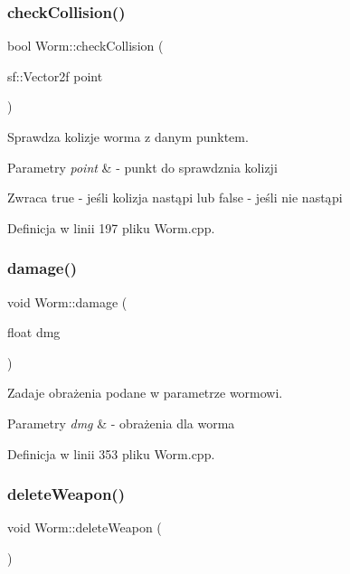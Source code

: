 \subsubsection{\texorpdfstring{check\+Collision()}{checkCollision()}}
{\footnotesize\ttfamily bool Worm\+::check\+Collision (\begin{DoxyParamCaption}\item[{sf\+::\+Vector2f}]{point }\end{DoxyParamCaption})}



Sprawdza kolizje worma z danym punktem. 


\begin{DoxyParams}{Parametry}
{\em point} & -\/ punkt do sprawdznia kolizji \\
\hline
\end{DoxyParams}
\begin{DoxyReturn}{Zwraca}
true -\/ jeśli kolizja nastąpi lub false -\/ jeśli nie nastąpi 
\end{DoxyReturn}


Definicja w linii 197 pliku Worm.\+cpp.

\mbox{\label{class_worm_aa57fe22ce4031e5332d16d709e7274c8}} 
\subsubsection{\texorpdfstring{damage()}{damage()}}
{\footnotesize\ttfamily void Worm\+::damage (\begin{DoxyParamCaption}\item[{float}]{dmg }\end{DoxyParamCaption})}



Zadaje obrażenia podane w parametrze wormowi. 


\begin{DoxyParams}{Parametry}
{\em dmg} & -\/ obrażenia dla worma \\
\hline
\end{DoxyParams}


Definicja w linii 353 pliku Worm.\+cpp.

\mbox{\label{class_worm_adbede9b2b03f764f71629a299aec5299}} 
\subsubsection{\texorpdfstring{delete\+Weapon()}{deleteWeapon()}}
{\footnotesize\ttfamily void Worm\+::delete\+Weapon (\begin{DoxyParamCaption}{ }\end{DoxyParamCaption})}



